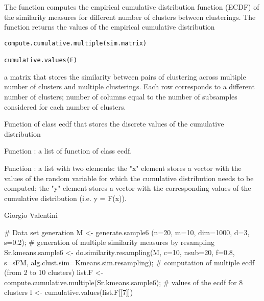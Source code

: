 \documentclass{article}
\begin{document}
\begin{Description}\relax
The function  computes the empirical cumulative distribution function (ECDF) of the similarity measures 
for different number of clusters between clusterings.
The function  returns the values of the empirical cumulative distribution
\end{Description}
\begin{Usage}
\begin{verbatim}
compute.cumulative.multiple(sim.matrix)

cumulative.values(F)
\end{verbatim}
\end{Usage}
\begin{Arguments}
\begin{ldescription}
\item[\code{sim.matrix}] a matrix that stores the similarity between pairs of clustering across multiple number of clusters
and multiple clusterings. Each row corresponds to a different number of clusters; number of columns
equal to  the number of subsamples considered for each number of clusters. 
\item[\code{F}] Function of class ecdf  that stores the discrete values of the cumulative distribution 
\end{ldescription}
\end{Arguments}
\begin{Value}
Function  : a list of function of class ecdf.

Function  :      a list with two elements: the "x" element stores a vector with the values of the random variable for
which the cumulative distribution needs to be computed; the "y" element stores a vector with the corresponding
values of the cumulative distribution (i.e. y = F(x)).
\end{Value}
\begin{Author}\relax
Giorgio Valentini 
\end{Author}
\begin{SeeAlso}\relax
{}
\end{SeeAlso}
\begin{Examples}
\begin{ExampleCode}
# Data set generation
M <- generate.sample6 (n=20, m=10, dim=1000, d=3, s=0.2);
# generation of multiple similarity measures by resampling
Sr.kmeans.sample6 <- do.similarity.resampling(M, c=10, nsub=20, f=0.8, s=sFM, 
                                      alg.clust.sim=Kmeans.sim.resampling); 
# computation of multiple ecdf (from 2 to 10 clusters)
list.F <- compute.cumulative.multiple(Sr.kmeans.sample6);
# values of the ecdf for 8 clusters 
l <- cumulative.values(list.F[[7]])
\end{ExampleCode}
\end{Examples}
\end{document}
